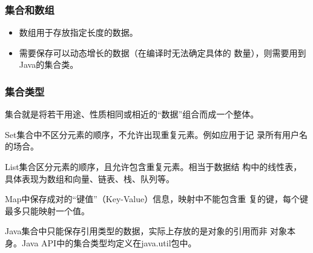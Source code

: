 \begin{frame}[fragile]
  \frametitle{集合和数组}

  
  \begin{itemize}[<+-|alert@+>]\hei
  \item 数组用于存放指定长度的数据。
  \item 需要保存可以动态增长的数据（在编译时无法确定具体的
    数量），则需要用到Java的集合类。
  \end{itemize}
\end{frame}

\begin{frame}[fragile] %
  \frametitle{集合类型}

  {\hei\Red 集合就是将若干用途、性质相同或相近的“数据”组合而成一个整体。}

  \pause
  

  \begin{description}[<+-|alert@+>]
  \item[集] Set集合中不区分元素的顺序，不允许出现重复元素。例如应用于记
    录所有用户名的场合。
  \item[列表] List集合区分元素的顺序，且允许包含重复元素。相当于数据结
    构中的线性表，具体表现为数组和向量、链表、栈、队列等。
  \item[映射] Map中保存成对的“键值”（Key-Value）信息，映射中不能包含重
    复的键，每个键最多只能映射一个值。
  \end{description}

  \pause

  
  {\kai Java集合中只能保存引用类型的数据，实际上存放的是对象的引用而非
    对象本身。Java API中的集合类型均定义在java.util包中。}
\end{frame}


